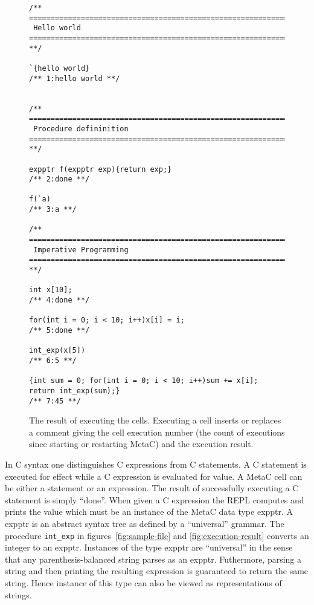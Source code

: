 \documentclass{article}
\begin{document}
\begin{figure}
 \begin{verbatim}
/** ========================================================================
 Hello world
======================================================================== **/

`{hello world}
/** 1:hello world **/


/** ========================================================================
 Procedure defininition
======================================================================== **/

expptr f(expptr exp){return exp;}
/** 2:done **/

f(`a)
/** 3:a **/

/** ========================================================================
 Imperative Programming
======================================================================== **/

int x[10];
/** 4:done **/

for(int i = 0; i < 10; i++)x[i] = i;
/** 5:done **/

int_exp(x[5])
/** 6:5 **/

{int sum = 0; for(int i = 0; i < 10; i++)sum += x[i]; return int_exp(sum);}
/** 7:45 **/
\end{verbatim}
\caption{The result of executing the cells.  Executing a cell inserts or replaces a comment
  giving the cell execution number (the count of executions since starting or restarting MetaC)
  and the execution result.}
\label{fig:execution-results}
\end{figure}

In C syntax one distinguishes C expressions from C statements.  A C
statement is executed for effect while a C expression is evaluated for
value. A MetaC cell can be either a statement or an expression.  The result of successfully
executing a C statement is simply ``done''.
When given a C expression the REPL computes and prints
the value which must be an instance of the MetaC data type expptr.
A expptr is an abstract syntax tree as defined by a ``universal'' grammar.
The procedure {\tt int\_exp} in figures~\ref{fig:sample-file} and \ref{fig:execution-result}
converts an integer to an expptr.  Instances of the type expptr are ``universal'' in the sense that any parenthesis-balanced string
parses as an expptr.  Futhermore, parsing a string and then printing the resulting expression is guaranteed to return the same string.
Hence instance of this type can also be viewed as representations of strings.
\end{document}

